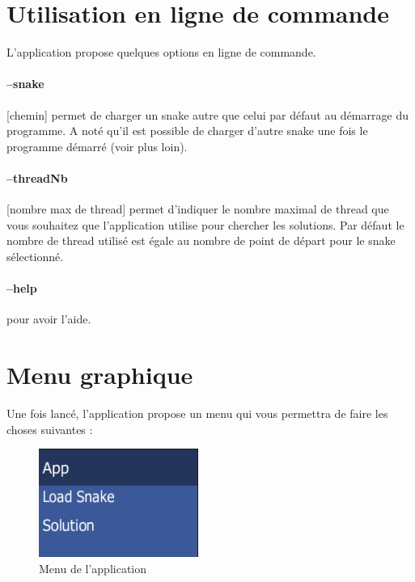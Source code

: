 \section*{Utilisation en ligne de commande}
L'application propose quelques options en ligne de commande.

\paragraph{--snake} [chemin] permet de charger un snake autre que celui par défaut au démarrage du programme. A noté qu'il est possible de charger d'autre snake une fois le programme démarré (voir plus loin).

\paragraph{--threadNb} [nombre max de thread] permet d'indiquer le nombre maximal de thread que vous souhaitez que l'application utilise pour chercher les solutions. Par défaut le nombre de thread utilisé est égale au nombre de point de départ pour le snake sélectionné.

\paragraph{--help} pour avoir l'aide.

\section*{Menu graphique}
Une fois lancé, l'application propose un menu qui vous permettra de faire les choses suivantes :

\begin{figure}[h]
 \centering
 \includegraphics[scale=0.7,keepaspectratio=true]{img/menu1.png}
 \caption{Menu de l'application}
\end{figure}